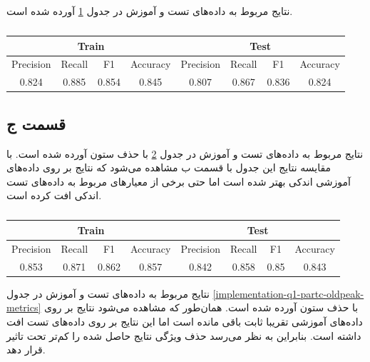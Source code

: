 \documentclass{article}
\begin{document}
نتایج مربوط به داده‌های تست و آموزش در جدول \ref{implementation-q1-partb-metrics}
آورده شده است.

\begin{latin}
\begin{table}[h]
    \centering
    \caption{}
    \begin{tabular}{c|c|c|c|c|c|c|c}
        \multicolumn{4}{c|}{Train} & \multicolumn{4}{|c}{Test} \\
        \hline
        Precision & Recall & F1 & Accuracy & Precision & Recall & F1 & Accuracy \\
        \hline
        0.824 & 0.885 & 0.854 & 0.845 & 0.807 & 0.867 & 0.836 & 0.824
    \end{tabular}
    \label{implementation-q1-partb-metrics}
\end{table}
\end{latin}

\subsection*{قسمت ج}

نتایج مربوط به داده‌های تست و آموزش در جدول \ref{implementation-q1-partc-chol-metrics} با حذف ستون
 آورده شده است. با مقایسه نتایج این جدول با قسمت ب مشاهده می‌شود که
نتایج بر روی داده‌های آموزشی اندکی بهتر شده است اما
حتی برخی از معیار‌های مربوط به داده‌های تست اندکی افت کرده است.

\begin{latin}
\begin{table}[h]
    \centering
    \caption{}
    \begin{tabular}{c|c|c|c|c|c|c|c}
        \multicolumn{4}{c|}{Train} & \multicolumn{4}{|c}{Test} \\
        \hline
        Precision & Recall & F1 & Accuracy & Precision & Recall & F1 & Accuracy \\
        \hline
        0.853 & 0.871 & 0.862 & 0.857 & 0.842 & 0.858 & 0.85 & 0.843
    \end{tabular}
    \label{implementation-q1-partc-chol-metrics}
\end{table}
\end{latin}

نتایج مربوط به داده‌های تست و آموزش در جدول \ref{implementation-q1-partc-oldpeak-metrics} با حذف ستون
 آورده شده است. همان‌طور که مشاهده می‌شود نتایج بر روی داده‌های آموزشی تقریبا ثابت
باقی مانده است اما این نتایج بر روی داده‌های تست افت داشته است. بنابراین به نظر می‌رسد حذف
ویژگی  نتایج حاصل شده را کم‌تر تحت تاثیر قرار دهد.
\end{document}
